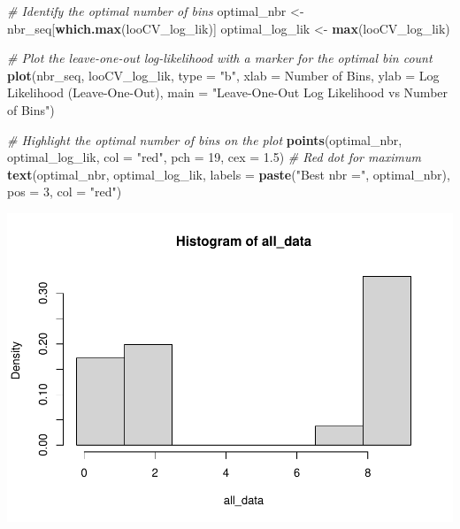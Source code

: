 \documentclass[
]{article}
\newenvironment{Shaded}{\begin{snugshade}}{\end{snugshade}}
\newcommand{\AttributeTok}[1]{\textcolor[rgb]{0.13,0.29,0.53}{#1}}
\newcommand{\CommentTok}[1]{\textcolor[rgb]{0.56,0.35,0.01}{\textit{#1}}}
\newcommand{\DecValTok}[1]{\textcolor[rgb]{0.00,0.00,0.81}{#1}}
\newcommand{\FloatTok}[1]{\textcolor[rgb]{0.00,0.00,0.81}{#1}}
\newcommand{\FunctionTok}[1]{\textcolor[rgb]{0.13,0.29,0.53}{\textbf{#1}}}
\newcommand{\NormalTok}[1]{#1}
\newcommand{\OtherTok}[1]{\textcolor[rgb]{0.56,0.35,0.01}{#1}}
\newcommand{\StringTok}[1]{\textcolor[rgb]{0.31,0.60,0.02}{#1}}
\begin{document}
\begin{Shaded}
\begin{Highlighting}[]
\CommentTok{\# Identify the optimal number of bins}
\NormalTok{optimal\_nbr }\OtherTok{\textless{}{-}}\NormalTok{ nbr\_seq[}\FunctionTok{which.max}\NormalTok{(looCV\_log\_lik)]}
\NormalTok{optimal\_log\_lik }\OtherTok{\textless{}{-}} \FunctionTok{max}\NormalTok{(looCV\_log\_lik)}

\CommentTok{\# Plot the leave{-}one{-}out log{-}likelihood with a marker for the optimal bin count}
\FunctionTok{plot}\NormalTok{(nbr\_seq, looCV\_log\_lik, }\AttributeTok{type =} \StringTok{"b"}\NormalTok{, }\AttributeTok{xlab =} \StringTok{\textquotesingle{}Number of Bins\textquotesingle{}}\NormalTok{, }\AttributeTok{ylab =} \StringTok{\textquotesingle{}Log Likelihood (Leave{-}One{-}Out)\textquotesingle{}}\NormalTok{,}
     \AttributeTok{main =} \StringTok{"Leave{-}One{-}Out Log Likelihood vs Number of Bins"}\NormalTok{)}

\CommentTok{\# Highlight the optimal number of bins on the plot}
\FunctionTok{points}\NormalTok{(optimal\_nbr, optimal\_log\_lik, }\AttributeTok{col =} \StringTok{"red"}\NormalTok{, }\AttributeTok{pch =} \DecValTok{19}\NormalTok{, }\AttributeTok{cex =} \FloatTok{1.5}\NormalTok{)  }\CommentTok{\# Red dot for maximum}
\FunctionTok{text}\NormalTok{(optimal\_nbr, optimal\_log\_lik, }\AttributeTok{labels =} \FunctionTok{paste}\NormalTok{(}\StringTok{"Best nbr ="}\NormalTok{, optimal\_nbr), }\AttributeTok{pos =} \DecValTok{3}\NormalTok{, }\AttributeTok{col =} \StringTok{"red"}\NormalTok{)}
\end{Highlighting}
\end{Shaded}

\includegraphics{Delivery1_files/figure-latex/unnamed-chunk-3-1.pdf}
\end{document}
